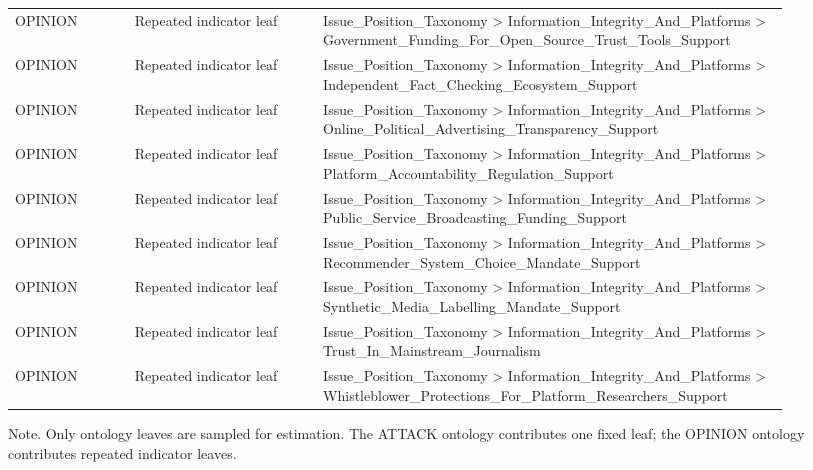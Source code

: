 \begin{table}[htbp]
\begin{threeparttable}
\begin{tabular}{p{0.14\linewidth}p{0.22\linewidth}p{0.54\linewidth}}
OPINION & Repeated indicator leaf & Issue\_Position\_Taxonomy > Information\_Integrity\_And\_Platforms > Government\_Funding\_For\_Open\_Source\_Trust\_Tools\_Support \\
OPINION & Repeated indicator leaf & Issue\_Position\_Taxonomy > Information\_Integrity\_And\_Platforms > Independent\_Fact\_Checking\_Ecosystem\_Support \\
OPINION & Repeated indicator leaf & Issue\_Position\_Taxonomy > Information\_Integrity\_And\_Platforms > Online\_Political\_Advertising\_Transparency\_Support \\
OPINION & Repeated indicator leaf & Issue\_Position\_Taxonomy > Information\_Integrity\_And\_Platforms > Platform\_Accountability\_Regulation\_Support \\
OPINION & Repeated indicator leaf & Issue\_Position\_Taxonomy > Information\_Integrity\_And\_Platforms > Public\_Service\_Broadcasting\_Funding\_Support \\
OPINION & Repeated indicator leaf & Issue\_Position\_Taxonomy > Information\_Integrity\_And\_Platforms > Recommender\_System\_Choice\_Mandate\_Support \\
OPINION & Repeated indicator leaf & Issue\_Position\_Taxonomy > Information\_Integrity\_And\_Platforms > Synthetic\_Media\_Labelling\_Mandate\_Support \\
OPINION & Repeated indicator leaf & Issue\_Position\_Taxonomy > Information\_Integrity\_And\_Platforms > Trust\_In\_Mainstream\_Journalism \\
OPINION & Repeated indicator leaf & Issue\_Position\_Taxonomy > Information\_Integrity\_And\_Platforms > Whistleblower\_Protections\_For\_Platform\_Researchers\_Support \\
\bottomrule
\end{tabular}
\begin{tablenotes}[flushleft]
\footnotesize
\item Note. Only ontology leaves are sampled for estimation. The ATTACK ontology contributes one fixed leaf; the OPINION ontology contributes repeated indicator leaves.
\end{tablenotes}
\end{threeparttable}
\end{table}
